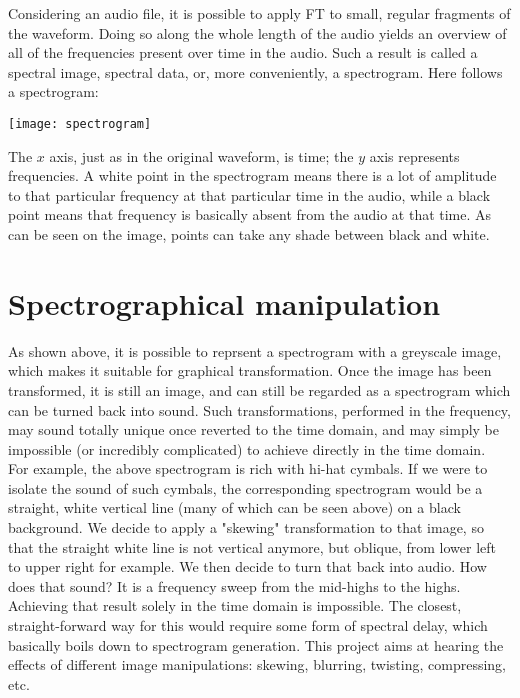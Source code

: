 \documentclass{article}
\begin{document}
    Considering an audio file, it is possible to apply FT to small, regular fragments of the waveform. Doing so along the whole length of the audio yields an overview of all of the frequencies present over time in the audio. Such a result is called a spectral image, spectral data, or, more conveniently, a spectrogram. Here follows a spectrogram:\\\noindent
    
    \texttt{[image: spectrogram]}\indent
    
    The $x$ axis, just as in the original waveform, is time; the $y$ axis represents frequencies. A white point in the spectrogram means there is a lot of amplitude to that particular frequency at that particular time in the audio, while a black point means that frequency is basically absent from the audio at that time. As can be seen on the image, points can take any shade between black and white.\\\indent

\section{Spectrographical manipulation}
    As shown above, it is possible to reprsent a spectrogram with a greyscale image, which makes it suitable for graphical transformation. Once the image has been transformed, it is still an image, and can still be regarded as a spectrogram which can be turned back into sound. Such transformations, performed in the frequency, may sound totally unique once reverted to the time domain, and may simply be impossible (or incredibly complicated) to achieve directly in the time domain.\\\indent
    For example, the above spectrogram is rich with hi-hat cymbals. If we were to isolate the sound of such cymbals, the corresponding spectrogram would be a straight, white vertical line (many of which can be seen above) on a black background. We decide to apply a "skewing" transformation to that image, so that the straight white line is not vertical anymore, but oblique, from lower left to upper right for example. We then decide to turn that back into audio. How does that sound? It is a frequency sweep from the mid-highs to the highs.\\\indent
    Achieving that result solely in the time domain is impossible. The closest, straight-forward way for this would require some form of spectral delay, which basically boils down to spectrogram generation. This project aims at hearing the effects of different image manipulations: skewing, blurring, twisting, compressing, etc.\\\noindent
\end{document}
